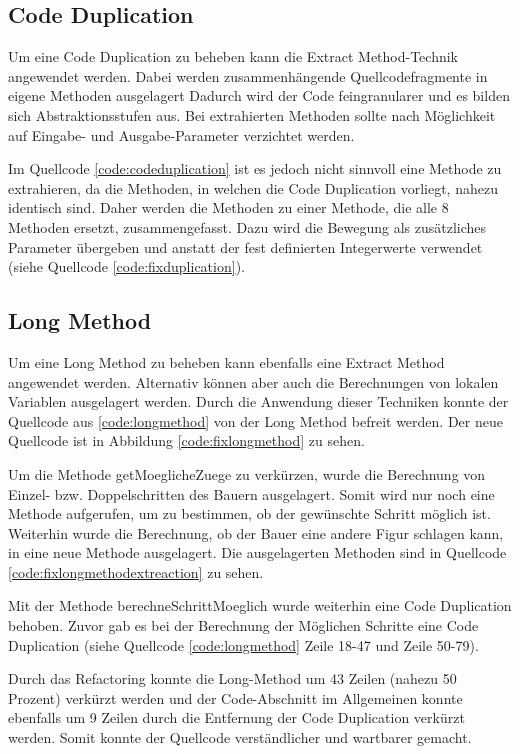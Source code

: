 \subsection{Code Duplication}
Um eine Code Duplication zu beheben kann die Extract Method-Technik angewendet werden. Dabei werden zusammenhängende Quellcodefragmente in eigene Methoden ausgelagert Dadurch wird der Code feingranularer und es bilden sich Abstraktionsstufen aus. Bei extrahierten Methoden sollte nach Möglichkeit auf Eingabe- und Ausgabe-Parameter verzichtet werden.

Im Quellcode \ref{code:codeduplication} ist es jedoch nicht sinnvoll eine Methode zu extrahieren, da die Methoden, in welchen die Code Duplication vorliegt, nahezu identisch sind. Daher werden die Methoden zu einer Methode, die alle 8 Methoden ersetzt, zusammengefasst. Dazu wird die Bewegung als zusätzliches Parameter übergeben und anstatt der fest definierten Integerwerte verwendet (siehe Quellcode \ref{code:fixduplication}). 




\subsection{Long Method}
Um eine Long Method zu beheben kann ebenfalls eine Extract Method angewendet werden. Alternativ können aber auch die Berechnungen von lokalen Variablen ausgelagert werden. Durch die Anwendung dieser Techniken konnte der Quellcode aus \ref{code:longmethod} von der Long Method befreit werden. Der neue Quellcode ist in Abbildung \ref{code:fixlongmethod} zu sehen.



Um die Methode getMoeglicheZuege zu verkürzen, wurde die Berechnung von Einzel- bzw. Doppelschritten des Bauern ausgelagert. Somit wird nur noch eine Methode aufgerufen, um zu bestimmen, ob der gewünschte Schritt möglich ist. Weiterhin wurde die Berechnung, ob der Bauer eine andere Figur schlagen kann, in eine neue Methode ausgelagert. Die ausgelagerten Methoden sind in Quellcode \ref{code:fixlongmethodextreaction} zu sehen. 




Mit der Methode berechneSchrittMoeglich wurde weiterhin eine Code Duplication behoben. Zuvor gab es bei der Berechnung der Möglichen Schritte eine Code Duplication (siehe Quellcode \ref{code:longmethod} Zeile 18-47 und Zeile 50-79).

Durch das Refactoring konnte die Long-Method um 43 Zeilen (nahezu 50 Prozent) verkürzt werden und der Code-Abschnitt im Allgemeinen konnte ebenfalls um 9 Zeilen durch die Entfernung der Code Duplication verkürzt werden. Somit konnte der Quellcode verständlicher und wartbarer gemacht.
